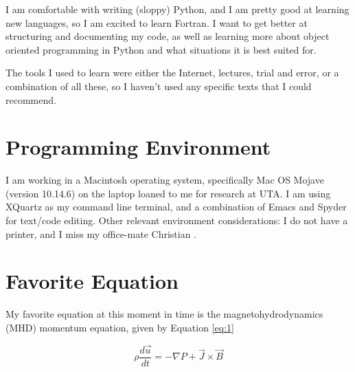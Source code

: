 \documentclass[12pt, letterpaper]{article}
\begin{document}
I am comfortable with writing (sloppy) Python, and I am pretty good at learning new languages, so I am excited to learn Fortran. I want to get better at structuring and documenting my code, as well as learning more about object oriented programming in Python and what situations it is best suited for.

The tools I used to learn were either the Internet, lectures, trial and error, or a combination of all these, so I haven't used any specific texts that I could recommend.

\section{Programming Environment}


I am working in a Macintosh operating system, specifically Mac OS Mojave (version 10.14.6) on the laptop loaned to me for research at UTA. I am using XQuartz as my command line terminal, and a combination of Emacs and Spyder for text/code editing. Other relevant environment considerations: I do not have a printer, and I miss my office-mate Christian \frownie{}.

\section{Favorite Equation}


My favorite equation at this moment in time is the magnetohydrodynamics (MHD) momentum equation, given by Equation \ref{eq:1}

\begin{equation}
  \label{eq:1}
  \rho \frac{d \vec{u}}{dt} = - \nabla P + \vec{J} \times \vec{B}
\end{equation}
\end{document}
